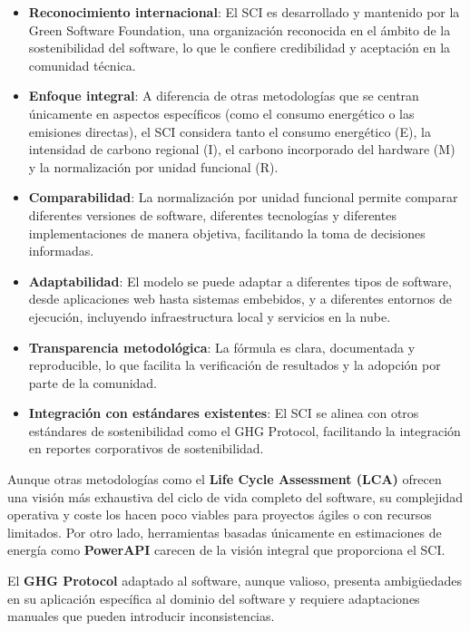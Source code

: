 \documentclass[12pt,a4paper]{report}
\begin{document}
\begin{itemize}
  \item \textbf{Reconocimiento internacional}: El SCI es desarrollado y mantenido por la Green Software Foundation, una organización reconocida en el ámbito de la sostenibilidad del software, lo que le confiere credibilidad y aceptación en la comunidad técnica.

  \item \textbf{Enfoque integral}: A diferencia de otras metodologías que se centran únicamente en aspectos específicos (como el consumo energético o las emisiones directas), el SCI considera tanto el consumo energético (E), la intensidad de carbono regional (I), el carbono incorporado del hardware (M) y la normalización por unidad funcional (R).

  \item \textbf{Comparabilidad}: La normalización por unidad funcional permite comparar diferentes versiones de software, diferentes tecnologías y diferentes implementaciones de manera objetiva, facilitando la toma de decisiones informadas.

  \item \textbf{Adaptabilidad}: El modelo se puede adaptar a diferentes tipos de software, desde aplicaciones web hasta sistemas embebidos, y a diferentes entornos de ejecución, incluyendo infraestructura local y servicios en la nube.

  \item \textbf{Transparencia metodológica}: La fórmula es clara, documentada y reproducible, lo que facilita la verificación de resultados y la adopción por parte de la comunidad.

  \item \textbf{Integración con estándares existentes}: El SCI se alinea con otros estándares de sostenibilidad como el GHG Protocol, facilitando la integración en reportes corporativos de sostenibilidad.
\end{itemize}

Aunque otras metodologías como el \textbf{Life Cycle Assessment (LCA)} ofrecen una visión más exhaustiva del ciclo de vida completo del software, su complejidad operativa y coste los hacen poco viables para proyectos ágiles o con recursos limitados. Por otro lado, herramientas basadas únicamente en estimaciones de energía como \textbf{PowerAPI} carecen de la visión integral que proporciona el SCI.

El \textbf{GHG Protocol} adaptado al software, aunque valioso, presenta ambigüedades en su aplicación específica al dominio del software y requiere adaptaciones manuales que pueden introducir inconsistencias.
\end{document}
